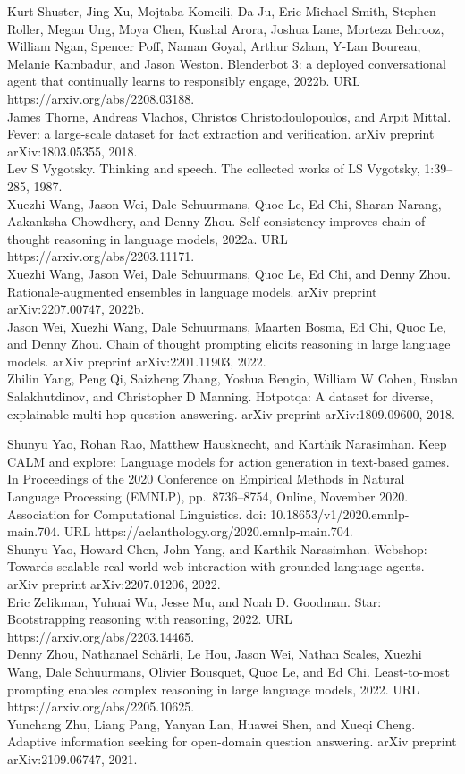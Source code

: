 \documentclass[
]{article}
\begin{document}
Kurt Shuster, Jing Xu, Mojtaba Komeili, Da Ju, Eric Michael Smith,
Stephen Roller, Megan Ung, Moya Chen, Kushal Arora, Joshua Lane, Morteza
Behrooz, William Ngan, Spencer Poff, Naman Goyal, Arthur Szlam, Y-Lan
Boureau, Melanie Kambadur, and Jason Weston. Blenderbot 3: a deployed
conversational agent that continually learns to responsibly engage,
2022b. URL https://arxiv.org/abs/2208.03188.\\
James Thorne, Andreas Vlachos, Christos Christodoulopoulos, and Arpit
Mittal. Fever: a large-scale dataset for fact extraction and
verification. arXiv preprint arXiv:1803.05355, 2018.\\
Lev S Vygotsky. Thinking and speech. The collected works of LS Vygotsky,
1:39--285, 1987.\\
Xuezhi Wang, Jason Wei, Dale Schuurmans, Quoc Le, Ed Chi, Sharan Narang,
Aakanksha Chowdhery, and Denny Zhou. Self-consistency improves chain of
thought reasoning in language models, 2022a. URL
https://arxiv.org/abs/2203.11171.\\
Xuezhi Wang, Jason Wei, Dale Schuurmans, Quoc Le, Ed Chi, and Denny
Zhou. Rationale-augmented ensembles in language models. arXiv preprint
arXiv:2207.00747, 2022b.\\
Jason Wei, Xuezhi Wang, Dale Schuurmans, Maarten Bosma, Ed Chi, Quoc Le,
and Denny Zhou. Chain of thought prompting elicits reasoning in large
language models. arXiv preprint arXiv:2201.11903, 2022.\\
Zhilin Yang, Peng Qi, Saizheng Zhang, Yoshua Bengio, William W Cohen,
Ruslan Salakhutdinov, and Christopher D Manning. Hotpotqa: A dataset for
diverse, explainable multi-hop question answering. arXiv preprint
arXiv:1809.09600, 2018.

Shunyu Yao, Rohan Rao, Matthew Hausknecht, and Karthik Narasimhan. Keep
CALM and explore: Language models for action generation in text-based
games. In Proceedings of the 2020 Conference on Empirical Methods in
Natural Language Processing (EMNLP), pp.~8736--8754, Online, November
2020. Association for Computational Linguistics. doi:
10.18653/v1/2020.emnlp-main.704. URL
https://aclanthology.org/2020.emnlp-main.704.\\
Shunyu Yao, Howard Chen, John Yang, and Karthik Narasimhan. Webshop:
Towards scalable real-world web interaction with grounded language
agents. arXiv preprint arXiv:2207.01206, 2022.\\
Eric Zelikman, Yuhuai Wu, Jesse Mu, and Noah D. Goodman. Star:
Bootstrapping reasoning with reasoning, 2022. URL
https://arxiv.org/abs/2203.14465.\\
Denny Zhou, Nathanael Schärli, Le Hou, Jason Wei, Nathan Scales, Xuezhi
Wang, Dale Schuurmans, Olivier Bousquet, Quoc Le, and Ed Chi.
Least-to-most prompting enables complex reasoning in large language
models, 2022. URL https://arxiv.org/abs/2205.10625.\\
Yunchang Zhu, Liang Pang, Yanyan Lan, Huawei Shen, and Xueqi Cheng.
Adaptive information seeking for open-domain question answering. arXiv
preprint arXiv:2109.06747, 2021.
\end{document}
